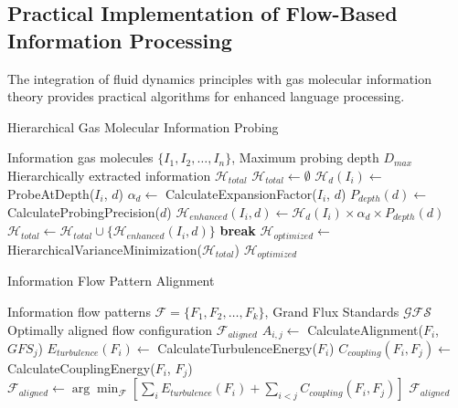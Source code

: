 \documentclass[12pt,a4paper]{article}
\begin{document}
\subsection{Practical Implementation of Flow-Based Information Processing}

The integration of fluid dynamics principles with gas molecular information theory provides practical algorithms for enhanced language processing.

\begin{algorithm}
\caption{Hierarchical Gas Molecular Information Probing}
\begin{algorithmic}[1]
\Require Information gas molecules $\{I_1, I_2, \ldots, I_n\}$, Maximum probing depth $D_{max}$
\Ensure Hierarchically extracted information $\mathcal{H}_{total}$
\State $\mathcal{H}_{total} \leftarrow \emptyset$
        \State $\mathcal{H}_d(I_i) \leftarrow$ ProbeAtDepth($I_i$, $d$)
        \State $\alpha_d \leftarrow$ CalculateExpansionFactor($I_i$, $d$)
        \State $P_{depth}(d) \leftarrow$ CalculateProbingPrecision($d$)
        \State $\mathcal{H}_{enhanced}(I_i, d) \leftarrow \mathcal{H}_d(I_i) \times \alpha_d \times P_{depth}(d)$
        \State $\mathcal{H}_{total} \leftarrow \mathcal{H}_{total} \cup \{\mathcal{H}_{enhanced}(I_i, d)\}$
            \State \textbf{break}
        \EndIf
    \EndFor
\EndFor
\State $\mathcal{H}_{optimized} \leftarrow$ HierarchicalVarianceMinimization($\mathcal{H}_{total}$)
\State \Return $\mathcal{H}_{optimized}$
\end{algorithmic}
\end{algorithm}

\begin{algorithm}
\caption{Information Flow Pattern Alignment}
\begin{algorithmic}[1]
\Require Information flow patterns $\mathcal{F} = \{F_1, F_2, \ldots, F_k\}$, Grand Flux Standards $\mathcal{GFS}$
\Ensure Optimally aligned flow configuration $\mathcal{F}_{aligned}$
        \State $A_{i,j} \leftarrow$ CalculateAlignment($F_i$, $GFS_j$)
        \State $E_{turbulence}(F_i) \leftarrow$ CalculateTurbulenceEnergy($F_i$)
    \EndFor
\EndFor
{}
    \State $C_{coupling}(F_i, F_j) \leftarrow$ CalculateCouplingEnergy($F_i$, $F_j$)
\EndFor
\State $\mathcal{F}_{aligned} \leftarrow \arg\min_{\mathcal{F}} \left[\sum_i E_{turbulence}(F_i) + \sum_{i<j} C_{coupling}(F_i, F_j)\right]$
\State \Return $\mathcal{F}_{aligned}$
\end{algorithmic}
\end{algorithm}
\end{document}
